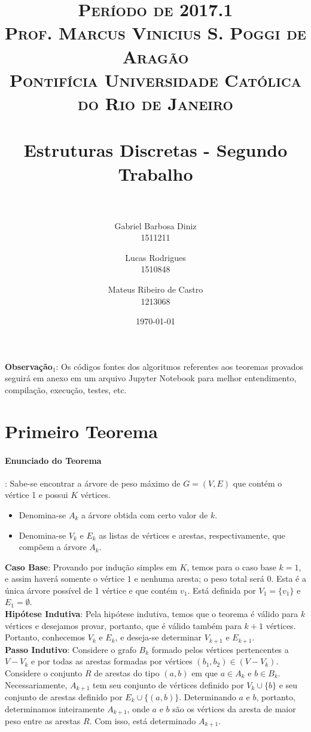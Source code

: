 \documentclass[paper=a4, fontsize=11pt]{scrartcl} %
\title{
\normalfont \normalsize 
\textsc{Período de 2017.1} \\
\textsc{Prof. Marcus Vinicius S. Poggi de Aragão} \\
\textsc{Pontifícia Universidade Católica do Rio de Janeiro} \\  [0.5cm] %
\horrule{1pt} \\  %
\LARGE Estruturas Discretas - Segundo Trabalho \\ %
\horrule{2pt} \\ %
}
\author{
\large Gabriel Barbosa Diniz \\
\large 1511211 \and 
\large Lucas Rodrigues \\ 
\large 1510848 \and 
\large Mateus Ribeiro de Castro \\ 
\large 1213068 \\
}
\date{\scshape\normalsize\today} %
\numberwithin{equation}{section} %
\numberwithin{figure}{section} %
\numberwithin{table}{section} %
\begin{document}
\maketitle %

\textbf{Observação$_1$}: Os códigos fontes dos algoritmos referentes aos teoremas provados seguirá em anexo em um arquivo Jupyter Notebook para melhor entendimento, compilação, execução, testes, etc.


\section{Primeiro Teorema}

\paragraph{Enunciado do Teorema}: Sabe-se encontrar a árvore de peso máximo de $G=(V,E)$ que contém o vértice 1 e possui $K$ vértices.\\

\begin{itemize}
   \item Denomina-se $A_k$ a árvore obtida com certo valor de $k$.
   \item Denomina-se $V_k$ e $E_k$ as listas de vértices e arestas, respectivamente, que compõem a árvore $A_k$.
\end{itemize}

\textbf{Caso Base}: Provando por indução simples em $K$, temos para o caso base $k=1$, e assim haverá somente o vértice $1$ e nenhuma aresta; o peso total será $0$. Esta é a única árvore possível de 1 vértice e que contém $v_1$. Está definida por $V_1 = \{v_1\}$ e $E_1 = \emptyset$.\\

\textbf{Hipótese Indutiva}: Pela hipótese indutiva, temos que o teorema é válido para $k$ vértices e desejamos provar, portanto, que é válido também para $k+1$ vértices. Portanto, conhecemos $V_k$ e $E_k$, e deseja-se determinar $V_{k+1}$ e $E_{k+1}$.\\

\textbf{Passo Indutivo}: Considere o grafo $B_k$ formado pelos vértices pertencentes a $V - V_k$ e por todas as arestas formadas por vértices $(b_1, b_2) \in (V - V_k)$. Considere o conjunto $R$ de arestas do tipo $(a, b)$ em que $a \in A_k$ e $b \in B_k$. Necessariamente, $A_{k+1}$ tem seu conjunto de vértices definido por $V_k \cup \{b\}$ e seu conjunto de arestas definido por $E_k \cup \{(a, b)\}$. Determinando $a$ e $b$, portanto, determinamos inteiramente $A_{k+1}$, onde $a$ e $b$ são os vértices da aresta de maior peso entre as arestas $R$. Com isso, está determinado $A_{k+1}$.\\
\end{document}
